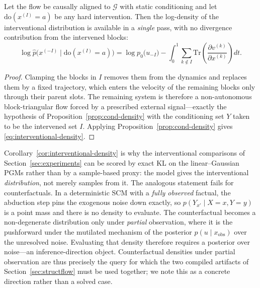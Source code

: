 \begin{corollary}
\label{cor:interventional-density}
Let the flow be causally aligned to $\mathcal{G}$ with static conditioning and let $\mathrm{do}(x^{(I)} = a)$ be any hard
intervention. Then the log-density of the interventional distribution is available in a
\emph{single} pass, with no divergence contribution from the intervened blocks:
\begin{equation}
\label{eq:interventional-density}
    \log \hat p\bigl(x^{(-I)} \mid \mathrm{do}(x^{(I)}{=}a)\bigr)
    = \log p_0\bigl(u_{-I}\bigr)
      - \int_0^1 \sum_{k \notin I}
        \mathrm{Tr}\!\left(\frac{\partial v^{(k)}}{\partial x^{(k)}}\right) dt .
\end{equation}
\end{corollary}

\begin{proof}
Clamping the blocks in $I$ removes them from the dynamics and replaces them by a fixed
trajectory, which enters the velocity of the remaining blocks only through their parent
slots. The remaining system is therefore a non-autonomous block-triangular flow forced by a
prescribed external signal---exactly the hypothesis of Proposition~\ref{prop:cond-density} with the conditioning
set $Y$ taken to be the intervened set $I$. Applying Proposition~\ref{prop:cond-density} gives
\eqref{eq:interventional-density}.
\end{proof}

\begin{remark}
\label{rem:density-scope}
Corollary~\ref{cor:interventional-density} is why the interventional comparisons of
Section~\ref{sec:experiments} can be scored by exact KL on the linear--Gaussian PGMs rather
than by a sample-based proxy: the model gives the interventional \emph{distribution}, not
merely samples from it. The analogous statement fails for counterfactuals. In a deterministic SCM with a \emph{fully observed} factual, the
abduction step pins the exogenous noise down exactly, so $p(Y_{x'} \mid X{=}x, Y{=}y)$ is a
point mass and there is no density to evaluate. The counterfactual becomes a non-degenerate distribution only under \emph{partial} observation, where it is the pushforward under the
mutilated mechanism of the posterior $p(u \mid x_{\mathrm{obs}})$ over the unresolved noise.
Evaluating that density therefore requires a posterior over noise---an inference-direction
object. Counterfactual densities under partial observation are thus precisely the query for
which the two compiled artifacts of Section~\ref{sec:structflow} must be used together; we
note this as a concrete direction rather than a solved case.
\end{remark}


